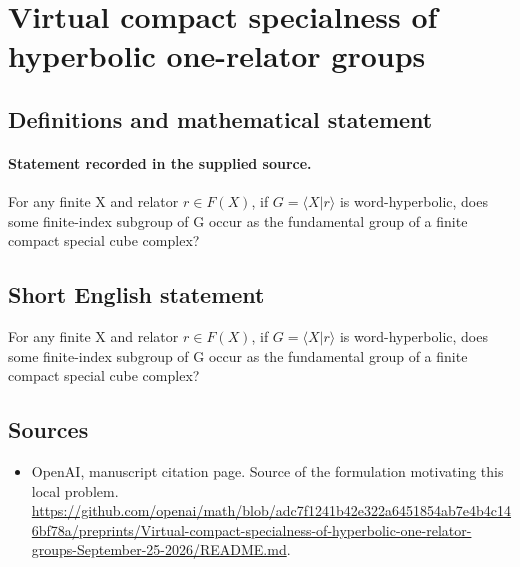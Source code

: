 \documentclass[11pt]{article}
\begin{document}
\section*{Virtual compact specialness of hyperbolic one-relator groups}\label{statement}
\subsection{Definitions and mathematical statement}
\paragraph{Statement recorded in the supplied source.}
For any finite X and relator $r\in F(X)$, if $G=\langle X|r\rangle $ is word-hyperbolic, does some finite-index subgroup of G occur as the fundamental group of a finite compact special cube complex?
\subsection{Short English statement}
For any finite X and relator $r\in F(X)$, if $G=\langle X|r\rangle $ is word-hyperbolic, does some finite-index subgroup of G occur as the fundamental group of a finite compact special cube complex?
\subsection{Sources}
\begin{itemize}
\item[S1] OpenAI, manuscript citation page. Source of the formulation motivating this local problem.
\url{https://github.com/openai/math/blob/adc7f1241b42e322a6451854ab7e4b4c146bf78a/preprints/Virtual-compact-specialness-of-hyperbolic-one-relator-groups-September-25-2026/README.md}.
\end{itemize}
\end{document}
